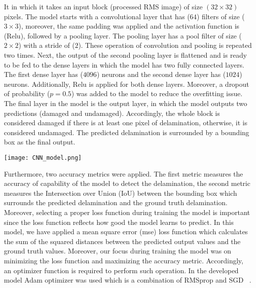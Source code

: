 It in which it takes an input block (processed RMS image) of size \((32\times 32)\) pixels.
The model starts with a convolutional layer that has (\(64\)) filters of size (\(3\times 3\)), moreover, the same padding was applied and the activation function is (Relu), followed by a pooling layer.
The pooling layer has a pool filter of size (\(2\times 2\)) with a stride of (\(2\)).
These operation of convolution and pooling is repeated two times.
Next, the output of the second pooling layer is flattened and is ready to be fed to the dense layers in which the model has two fully connected layers.
The first dense layer has (\(4096\)) neurons and the second dense layer has (\(1024\)) neurons.
Additionally, Relu is applied for both dense layers.
Moreover, a dropout of probability (\(p = 0.5\)) was added to the model to reduce the overfitting issue.
The final layer in the model is the output layer, in which the model outputs two predictions (damaged and undamaged). 
Accordingly, the whole block is considered damaged if there is at least one pixel of delamination, otherwise, it is considered undamaged.
The predicted delamination is surrounded by a bounding box as the final output.
\begin{Figure}
	\begin{center}
		\texttt{[image: CNN\_model.png]}
	\end{center}
	\label{CNN_model}
\end{Figure}
Furthermore, two accuracy metrics were applied.
The first metric measures the accuracy of capability of the model to detect the delamination, the second metric measures the Intersection over Union (IoU) between the bounding box which surrounds the predicted delamination and the ground truth delamination.
Moreover, selecting a proper loss function during training the model is important since the loss function reflects how good the model learns to predict.
In this model, we have applied a mean square error (mse) loss function which calculates the sum of the squared distances between the predicted output values and the ground truth values.
Moreover, our focus during training the model was on minimizing the loss function and maximizing the accuracy metric.
Accordingly, an optimizer function is required to perform such operation.
In the developed model Adam optimizer was used which is a combination of RMSprop and SGD ~\cite{Kingma2015}.